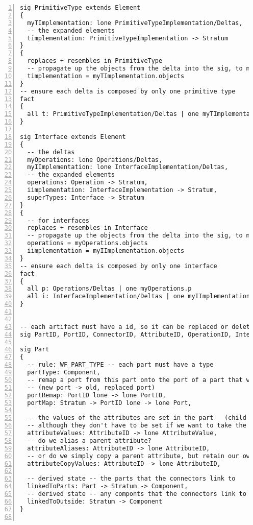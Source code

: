 \begin{lstlisting}[caption={bb\_structure.als}, numbers=left]
sig PrimitiveType extends Element
{
  myTImplementation: lone PrimitiveTypeImplementation/Deltas,
  -- the expanded elements
  timplementation: PrimitiveTypeImplementation -> Stratum
}
{
  replaces + resembles in PrimitiveType
  -- propagate up the objects from the delta into the sig, to make it more convenient
  timplementation = myTImplementation.objects
}
-- ensure each delta is composed by only one primitive type
fact
{
  all t: PrimitiveTypeImplementation/Deltas | one myTImplementation.t
}

sig Interface extends Element
{
  -- the deltas
  myOperations: lone Operations/Deltas,
  myIImplementation: lone InterfaceImplementation/Deltas,
  -- the expanded elements
  operations: Operation -> Stratum,  
  iimplementation: InterfaceImplementation -> Stratum,  
  superTypes: Interface -> Stratum
}
{
  -- for interfaces
  replaces + resembles in Interface
  -- propagate up the objects from the delta into the sig, to make it more convenient
  operations = myOperations.objects  
  iimplementation = myIImplementation.objects
}
-- ensure each delta is composed by only one interface
fact
{
  all p: Operations/Deltas | one myOperations.p
  all i: InterfaceImplementation/Deltas | one myIImplementation.i
}


-- each artifact must have a id, so it can be replaced or deleted
sig PartID, PortID, ConnectorID, AttributeID, OperationID, InterfaceImplementationID, ComponentImplementationID, PrimitiveTypeImplementationID, LinkID {}

sig Part
{
  -- rule: WF_PART_TYPE -- each part must have a type
  partType: Component,
  -- remap a port from this part onto the port of a part that we are replacing
  -- (new port -> old, replaced port)
  portRemap: PortID lone -> lone PortID,
  portMap: Stratum -> PortID lone -> lone Port,

  -- the values of the attributes are set in the part   (child id -> parent id)
  -- although they don't have to be set if we want to take the default
  attributeValues: AttributeID -> lone AttributeValue,
  -- do we alias a parent attribute?
  attributeAliases: AttributeID -> lone AttributeID,
  -- or do we simply copy a parent attribute, but retain our own state?
  attributeCopyValues: AttributeID -> lone AttributeID,

  -- derived state -- the parts that the connectors link to
  linkedToParts: Part -> Stratum -> Component,
  -- derived state -- any componts that the connectors link to
  linkedToOutside: Stratum -> Component
}


\end{lstlisting}
